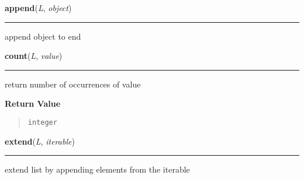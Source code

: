     \label{list:append}

    \vspace{0.5ex}

    \begin{boxedminipage}{\textwidth}

    \raggedright \textbf{append}(\textit{L}, \textit{object})

    \vspace{-1.5ex}

    \rule{\textwidth}{0.5\fboxrule}

append object to end
    \vspace{1ex}

    \end{boxedminipage}

    \label{list:count}

    \vspace{0.5ex}

    \begin{boxedminipage}{\textwidth}

    \raggedright \textbf{count}(\textit{L}, \textit{value})

    \vspace{-1.5ex}

    \rule{\textwidth}{0.5\fboxrule}

return number of occurrences of value
    \vspace{1ex}

      \textbf{Return Value}
      \begin{quote}
\begin{alltt}
integer
\end{alltt}

      \end{quote}

    \vspace{1ex}

    \end{boxedminipage}

    \label{list:extend}

    \vspace{0.5ex}

    \begin{boxedminipage}{\textwidth}

    \raggedright \textbf{extend}(\textit{L}, \textit{iterable})

    \vspace{-1.5ex}

    \rule{\textwidth}{0.5\fboxrule}

extend list by appending elements from the iterable
    \vspace{1ex}

    \end{boxedminipage}


